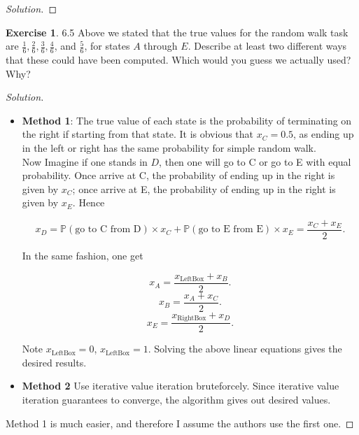 \documentclass[oneside,11pt]{article}
\theoremstyle{definition}
\newtheorem{exer}[thm]{Exercise}
\newcommand{\PP}{\mathbb{P}}
\newenvironment{solution}
{\renewcommand\qedsymbol{$\blacksquare$}\begin{proof}[Solution]} {\end{proof}}
\begin{document}
\begin{shaded}
\begin{solution} 


\end{solution} 
\end{shaded}

\begin{exer}
6.5 Above we stated that the true values for the random walk task are $\frac{1}{6}, \frac{2}{6}, \frac{3}{6}, \frac{4}{6}$, and $\frac{5}{6}$, for states $A$ through $E$. Describe at least two different ways that these could have been computed. Which would you guess we actually used? Why?
\end{exer}

\begin{shaded}
\begin{solution} 
~\\
\begin{itemize}
\item \textbf{Method 1}: The true value of each state is the probability of terminating on the right if starting from that state. It is obvious that $x_C = 0.5$, as ending up in the left or right has the same probability for simple random walk. \\

Now Imagine if one stands in $D$, then one will go to C or go to E with equal probability. Once arrive at C, the probability of ending up in the right is given by $x_C$; once arrive at E, the probability of ending up in the right is given by $x_E$. Hence 

\[x_D = \PP(\text{go to C from D}) \times x_C + \PP(\text{go to E from E}) \times  x_E = \frac{x_C + x_E}{2}.\]

In the same fashion, one get 

\[x_A = \frac{x_{\text{LeftBox}} + x_B}{2}. \]
\[x_B = \frac{x_{A} + x_C}{2}. \]
\[x_E = \frac{x_{\text{RightBox}} + x_D}{2}. \]

Note $x_{\text{LeftBox}} = 0$, $x_{\text{LeftBox}} = 1$. Solving the above linear equations gives the desired results.
\item \textbf{Method 2} Use iterative value iteration bruteforcely. Since iterative value iteration guarantees to converge, the algorithm gives out desired values.
\end{itemize}

Method 1 is much easier, and therefore I assume the authors use the first one.

\end{solution} 
\end{shaded}
\end{document}
